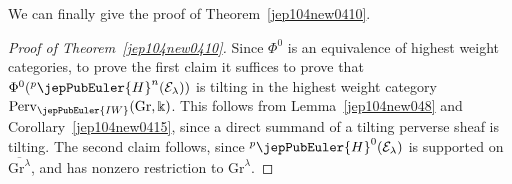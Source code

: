 We can finally give the proof of Theorem~\ref{jep104new0410}.
\begin{proof}[Proof of Theorem~\ref{jep104new0410}]
Since $\Phi^0$ is an equivalence of highest weight categories, to prove the first claim it suffices to prove that $\Phi^0({}^{p}\jepPubEuler{H}^{n}(\mathcal E_{\lambda}))$ is tilting in the highest weight category $\mathrm{Perv}_{\jepPubEuler{IW}}(\mathrm{Gr},\Bbbk)$.
This follows from Lemma~\ref{jep104new048} and Corollary~\ref{jep104new0415}, since a direct summand of a tilting perverse sheaf is tilting.
The second claim follows, since ${}^{p}\jepPubEuler{H}^{0}(\mathcal E_{\lambda})$ is supported on $\overline{\mathrm{Gr}^{\lambda}}$, and has nonzero restriction to $\mathrm{Gr}^{\lambda}$.
\end{proof}
